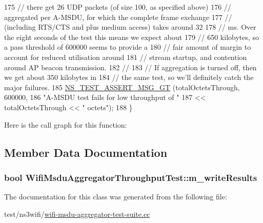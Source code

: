 \begin{DoxyCode}
175   \textcolor{comment}{// there get 26 UDP packets (of size 100, as specified above)}
176   \textcolor{comment}{// aggregated per A-MSDU, for which the complete frame exchange}
177   \textcolor{comment}{// (including RTS/CTS and plus medium access) takes around 32}
178   \textcolor{comment}{// ms. Over the eight seconds of the test this means we expect about}
179   \textcolor{comment}{// 650 kilobytes, so a pass threshold of 600000 seems to provide a}
180   \textcolor{comment}{// fair amount of margin to account for reduced utilisation around}
181   \textcolor{comment}{// stream startup, and contention around AP beacon transmission.}
182   \textcolor{comment}{//}
183   \textcolor{comment}{// If aggregation is turned off, then we get about 350 kilobytes in}
184   \textcolor{comment}{// the same test, so we'll definitely catch the major failures.}
185   \hyperlink{group__testing_ga868cfb773df312b867a506bdd2e3cbef}{NS\_TEST\_ASSERT\_MSG\_GT} (totalOctetsThrough, 600000,
186                          \textcolor{stringliteral}{"A-MSDU test fails for low throughput of "}
187                          << totalOctetsThrough << \textcolor{stringliteral}{" octets"});
188 \}
\end{DoxyCode}


Here is the call graph for this function\+:




\subsection{Member Data Documentation}
\subsubsection[{\texorpdfstring{m\+\_\+write\+Results}{m_writeResults}}]{\setlength{\rightskip}{0pt plus 5cm}bool Wifi\+Msdu\+Aggregator\+Throughput\+Test\+::m\+\_\+write\+Results\hspace{0.3cm}{\ttfamily [private]}}\hypertarget{classWifiMsduAggregatorThroughputTest_a89cd7fa2be793060e380600808fff076}{}\label{classWifiMsduAggregatorThroughputTest_a89cd7fa2be793060e380600808fff076}


The documentation for this class was generated from the following file\+:\begin{DoxyCompactItemize}
\item 
test/ns3wifi/\hyperlink{wifi-msdu-aggregator-test-suite_8cc}{wifi-\/msdu-\/aggregator-\/test-\/suite.\+cc}\end{DoxyCompactItemize}
